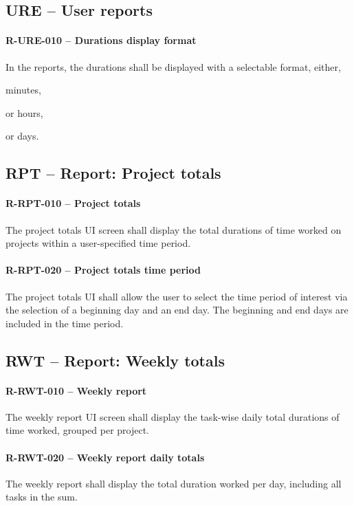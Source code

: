 \subsection{URE -- User reports}
\paragraph{R-URE-010 -- Durations display format}
In the reports, the durations shall be displayed with a selectable format,
either,
\begin{compactitem}
  \item minutes,
  \item or hours,
  \item or days.
\end{compactitem}

\subsection{RPT -- Report: Project totals}
\paragraph{R-RPT-010 -- Project totals}
The project totals UI screen shall display the total durations of time
worked on projects within a user-specified time period.

\paragraph{R-RPT-020 -- Project totals time period}
The project totals UI shall allow the user to select the time period
of interest via the selection of a beginning day and an end day. The
beginning and end days are included in the time period.

\subsection{RWT -- Report: Weekly totals}
\paragraph{R-RWT-010 -- Weekly report}
The weekly report UI screen shall display the task-wise daily total
durations of time worked, grouped per project.

\paragraph{R-RWT-020 -- Weekly report daily totals}
The weekly report shall display the total duration worked per day, including
all tasks in the sum.

